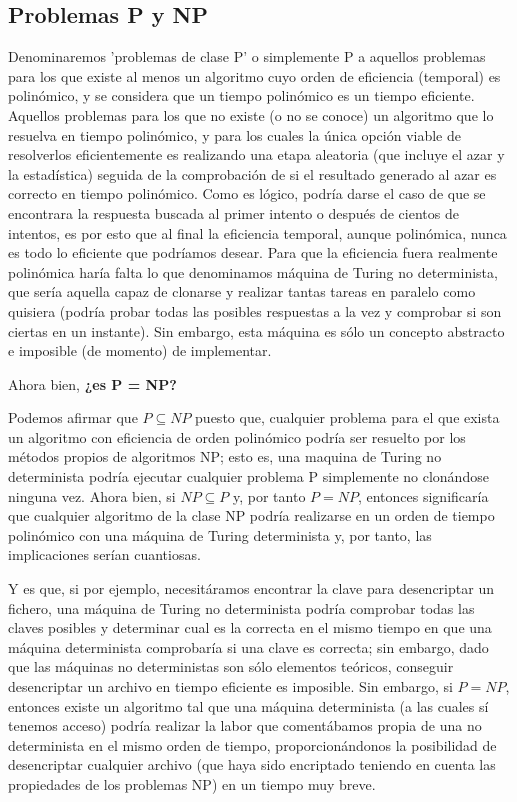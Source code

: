 \documentclass[a4paper, 11pt]{article}
\begin{document}
\subsection{Problemas P y NP}

Denominaremos 'problemas de clase P' o simplemente P a aquellos problemas para los que existe al menos un algoritmo cuyo orden de eficiencia (temporal) es polinómico, y se considera que un tiempo polinómico es un tiempo eficiente. Aquellos problemas para los que no existe (o no se conoce) un algoritmo que lo resuelva en tiempo polinómico, y para los cuales la única opción viable de resolverlos eficientemente es realizando una etapa aleatoria (que incluye el azar y la estadística) seguida de la comprobación de si el resultado generado al azar es correcto en tiempo polinómico. Como es lógico, podría darse el caso de que se encontrara la respuesta buscada al primer intento o después de cientos de intentos, es por esto que al final la eficiencia temporal, aunque polinómica, nunca es todo lo eficiente que podríamos desear. Para que la eficiencia fuera realmente polinómica haría falta lo que denominamos máquina de Turing no determinista, que sería aquella capaz de clonarse y realizar tantas tareas en paralelo como quisiera (podría probar todas las posibles respuestas a la vez y comprobar si son ciertas en un instante). Sin embargo, esta máquina es sólo un concepto abstracto e imposible (de momento) de implementar. 

Ahora bien, \textbf{ ¿es P = NP?}

Podemos afirmar que $ P \subseteq NP $ puesto que, cualquier problema para el que exista un algoritmo con eficiencia de orden polinómico podría ser resuelto por los métodos propios de algoritmos NP; esto es, una maquina de Turing no determinista podría ejecutar cualquier problema P simplemente no clonándose ninguna vez. Ahora bien, si $NP \subseteq P $ y, por tanto $ P = NP $, entonces significaría que cualquier algoritmo de la clase NP podría realizarse en un orden de tiempo polinómico con una máquina de Turing determinista y, por tanto, las implicaciones serían cuantiosas.

Y es que, si por ejemplo, necesitáramos encontrar la clave para desencriptar un fichero, una máquina de Turing no determinista podría comprobar todas las claves posibles y determinar cual es la correcta en el mismo tiempo en que una máquina determinista comprobaría si una clave es correcta; sin embargo, dado que las máquinas no deterministas son sólo elementos teóricos, conseguir desencriptar un archivo en tiempo eficiente es imposible. Sin embargo, si $ P = NP $, entonces existe un algoritmo tal que una máquina determinista (a las cuales sí tenemos acceso) podría realizar la labor que comentábamos propia de una no determinista en el mismo orden de tiempo, proporcionándonos la posibilidad de desencriptar cualquier archivo (que haya sido encriptado teniendo en cuenta las propiedades de los problemas NP) en un tiempo muy breve.
\end{document}
